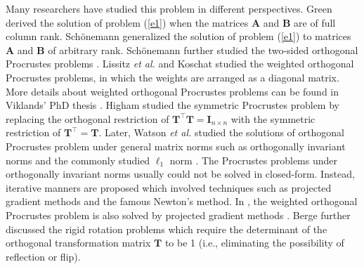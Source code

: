 \documentclass[titlepage,11pt,twoside]{article}
\begin{document}
Many researchers have studied this problem in different perspectives. Green \cite{green1952orthogonal} derived the solution of problem (\ref{e1}) when the matrices $\mathbf{A}$ and $\mathbf{B}$ are of full column rank. Sch{\"o}nemann \cite{schonemann1966generalized} generalized the solution of problem (\ref{e1}) to matrices $\mathbf{A}$ and $\mathbf{B}$ of arbitrary rank. Sch{\"o}nemann further studied the two-sided orthogonal Procrustes problems \cite{schonemann1968two}. Lissitz \emph{et al.} \cite{Lissitz1976} and Koschat \cite{Koschat1991} studied the weighted orthogonal Procrustes problems, in which the weights are arranged as a diagonal matrix. More details about weighted orthogonal Procrustes problems can be found in Viklands' PhD thesis \cite{viklands2006algorithms}. Higham \cite{higham1988symmetric} studied the symmetric Procrustes problem by replacing the orthogonal restriction of $\mathbf{T}^{\top}\mathbf{T}=\mathbf{I}_{n\times n}$ with the symmetric restriction of $\mathbf{T}^{\top}=\mathbf{T}$. Later, Watson \emph{et al.} studied the solutions of orthogonal Procrustes problem under general matrix norms such as orthogonally invariant norms \cite{Watson1994} and the commonly studied $\ell_{1}$ norm \cite{trendafilov2004l1}. The Procrustes problems under orthogonally invariant norms usually could not be solved in closed-form. Instead, iterative manners are proposed which involved techniques such as projected gradient methods \cite{chu1990projected} and the famous Newton's method. In \cite{trendafilov2004l1}, the weighted orthogonal Procrustes problem is also solved by projected gradient methods \cite{chu1990projected}. Berge \cite{Berge2006} further discussed the rigid rotation problems which require the determinant of the orthogonal transformation matrix $\mathbf{T}$ to be 1 (i.e., eliminating the possibility of reflection or flip).
\end{document}
